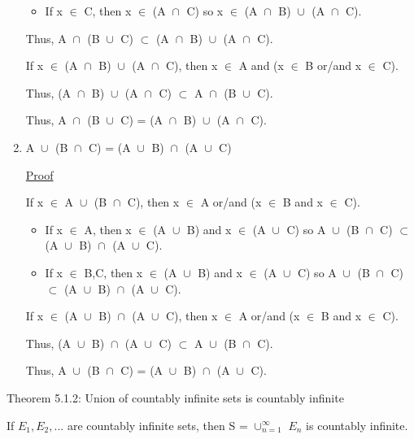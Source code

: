 \begin{enumerate}[label=(\alph*), leftmargin=2cm]
\begin{itemize}[leftmargin=1cm]
					\item If x $\in$ C, then x $\in$ (A $\cap_{}^{}$ C) so
						x $\in$ (A $\cap_{}^{}$ B) $\cup_{}^{}$ (A $\cap_{}^{}$ C).
				\end{itemize}
				Thus, A $\cap_{}^{}$ (B $\cup_{}^{}$ C)
				$\subset$ (A $\cap_{}^{}$ B) $\cup_{}^{}$ (A $\cap_{}^{}$ C).
				
				If x $\in$ (A $\cap_{}^{}$ B) $\cup_{}^{}$ (A $\cap_{}^{}$ C),
				then x $\in$ A and (x $\in$ B or/and x $\in$ C).

				Thus, (A $\cap_{}^{}$ B) $\cup_{}^{}$ (A $\cap_{}^{}$ C)
				$\subset$ A $\cap_{}^{}$ (B $\cup_{}^{}$ C).

				Thus, A $\cap_{}^{}$ (B $\cup_{}^{}$ C)
				= (A $\cap_{}^{}$ B) $\cup_{}^{}$ (A $\cap_{}^{}$ C).

		\newpage

		\item A $\cup_{}^{}$ (B $\cap_{}^{}$ C) = (A $\cup_{}^{}$ B) $\cap_{}^{}$ (A $\cup_{}^{}$ C)

			{ \color{magenta} \underline{Proof} } 
			
			If x $\in$ A $\cup_{}^{}$ (B $\cap_{}^{}$ C), then
			x $\in$ A or/and (x $\in$ B and x $\in$ C).
			\begin{itemize}[leftmargin=1cm]
				\item If x $\in$ A, then x $\in$ (A $\cup_{}^{}$ B)
					and x $\in$ (A $\cup_{}^{}$ C)
					so A $\cup_{}^{}$ (B $\cap_{}^{}$ C) $\subset$
					(A $\cup_{}^{}$ B) $\cap_{}^{}$ (A $\cup_{}^{}$ C).

				\item If x $\in$ B,C, then x $\in$ (A $\cup_{}^{}$ B)
					and x $\in$ (A $\cup_{}^{}$ C)
					so A $\cup_{}^{}$ (B $\cap_{}^{}$ C) $\subset$
					(A $\cup_{}^{}$ B) $\cap_{}^{}$ (A $\cup_{}^{}$ C).
			\end{itemize}
			If x $\in$ (A $\cup_{}^{}$ B) $\cap_{}^{}$ (A $\cup_{}^{}$ C), then
			x $\in$ A or/and (x $\in$ B and x $\in$ C).

			Thus, (A $\cup_{}^{}$ B) $\cap_{}^{}$ (A $\cup_{}^{}$ C)
			$\subset$ A $\cup_{}^{}$ (B $\cap_{}^{}$ C).

			Thus, A $\cup_{}^{}$ (B $\cap_{}^{}$ C)
			= (A $\cup_{}^{}$ B) $\cap_{}^{}$ (A $\cup_{}^{}$ C).
	\end{enumerate}

{ \color{red} Theorem 5.1.2: Union of countably infinite sets is countably infinite } 

	\begin{adjustbox}{minipage=14cm, right}
		If $E_1, E_2, ... $ are countably infinite sets, then S = $\cup_{n=1}^{\infty}$ $E_n$
		is countably infinite.
	\end{adjustbox}


